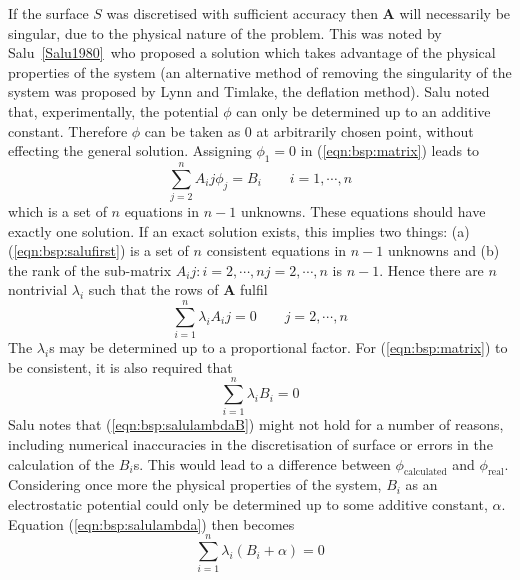 If the surface $S$ was discretised with sufficient accuracy then $\mathbf{A}$
will necessarily be singular, due to the physical nature of the problem.
This was noted by Salu~\ref{Salu1980}\ who proposed a solution which takes
advantage of the physical properties of the system (an alternative method of
removing the singularity of the system was proposed by Lynn and Timlake, the
deflation method).
Salu noted that, experimentally, the potential $\phi$ can only be determined up to
an additive constant.
Therefore $\phi$ can be taken as $0$ at arbitrarily chosen point, without
effecting the general solution.
Assigning $\phi_1 = 0$ in (\ref{eqn:bsp:matrix}) leads to
\begin{equation}
\label{eqn:bsp:salufirst}
\sum_{j=2}^n A_ij \phi_j = B_i \quad\quad  i = 1,\cdots, n
\end{equation}
which is a set of $n$ equations in $n-1$ unknowns.
These equations should have exactly one solution.
If an exact solution exists, this implies two things: (a)
(\ref{eqn:bsp:salufirst}) is a set of $n$ consistent equations in $n-1$ unknowns
and (b) the rank of the sub-matrix $A_ij: i=2,\cdots,n j=2,\cdots,n$ is $n-1$.
Hence there are $n$ nontrivial $\lambda_i$ such that the rows of $\textbf{A}$
fulfil
\begin{equation}
\label{eqn:bsp:salulambda}
\sum_{i=1}^n \lambda_i A_ij  = 0 \quad\quad  j = 2,\cdots, n
\end{equation}
The $\lambda_i$s may be determined up to a proportional factor.
For (\ref{eqn:bsp:matrix}) to be consistent, it is also required that
\begin{equation}
\label{eqn:bsp:salulambdaB}
\sum_{i=1}^n \lambda_i B_i  = 0
\end{equation}
Salu notes that (\ref{eqn:bsp:salulambdaB}) might not hold for a number of
reasons, including numerical inaccuracies in the discretisation of surface or
errors in the calculation of the $B_i$s.
This would lead to a difference between $\phi_{\text{calculated}}$ and
$\phi_{\text{real}}$.
Considering once more the physical properties of the system, $B_i$ as an
electrostatic potential could only be determined up to some additive constant,
$\alpha$.
Equation (\ref{eqn:bsp:salulambda}) then becomes
\begin{equation}
\label{eqn:bsp:salulambdaalpha}
\sum_{i=1}^n \lambda_i \left(B_i+\alpha\right)  = 0
\end{equation}

